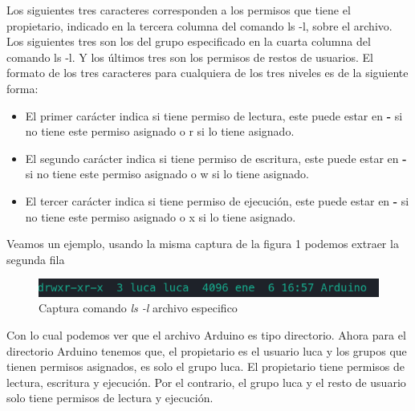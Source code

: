 \documentclass[12pt,a4paper]{article} %
\begin{document}
	Los siguientes tres caracteres corresponden a los permisos que tiene el propietario, indicado en la tercera columna del comando ls -l, sobre el archivo. Los siguientes tres son los del grupo especificado en la cuarta columna del comando ls -l. Y los últimos tres son los permisos de restos de usuarios. El formato de los tres caracteres para cualquiera de los tres niveles es de la siguiente forma:
	\begin{itemize}
		\item El primer carácter indica si tiene permiso de lectura, este puede estar en \textbf{-} si no tiene este permiso asignado o r si lo tiene asignado.
		\item El segundo carácter indica si tiene permiso de escritura, este puede estar en \textbf{-} si no tiene este permiso asignado o w si lo tiene asignado.
		\item El tercer carácter indica si tiene permiso de ejecución, este puede estar en \textbf{-} si no tiene este permiso asignado o x si lo tiene asignado.
	\end{itemize}
	Veamos un ejemplo, usando la misma captura de la figura 1 podemos extraer la segunda fila\par
	\begin{figure}[h]
		\includegraphics[scale=1]{archivo_permisos}
		\centering
		\caption{Captura comando \textit{ls -l} archivo especifico}
	\end{figure}
	Con lo cual podemos ver que el archivo Arduino es tipo directorio. Ahora para el directorio Arduino tenemos que, el propietario es el usuario luca y los grupos que tienen permisos asignados, es solo el grupo luca. El propietario tiene permisos de lectura, escritura y ejecución. Por el contrario, el grupo luca y el resto de usuario solo tiene permisos de lectura y ejecución.
\end{document}
